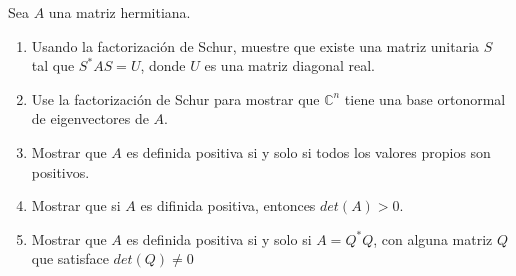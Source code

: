 \documentclass[12pt]{book}
\newcommand{\C}{\mathbb{C}}
\begin{document}
\eje Sea $A$ una matriz hermitiana.
\renewcommand{\labelenumi}{(\alph{enumi})}
\begin{enumerate}
    \item Usando la factorización de Schur, muestre que existe una matriz unitaria $S$ tal que $S^*AS=U$, donde $U$ es una matriz diagonal real. 
    \item Use la factorización de Schur para mostrar que $\C^n$ tiene una base ortonormal de eigenvectores de $A$.
    \item Mostrar que $A$ es definida positiva si y solo si todos los valores propios son positivos.
    \item Mostrar que si $A$ es difinida positiva, entonces $det(A)>0$.
    \item Mostrar que $A$ es definida positiva si y solo si $A=Q^*Q$, con alguna matriz $Q$ que satisface $det(Q)\neq0$
\end{enumerate}
\end{document}
